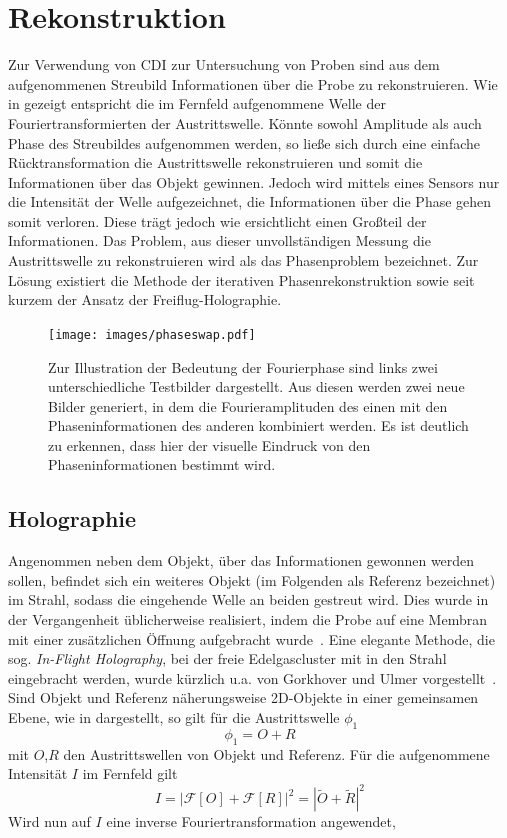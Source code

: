 \chapter{Rekonstruktion}
Zur Verwendung von CDI zur Untersuchung von Proben sind aus dem aufgenommenen Streubild Informationen über die Probe zu rekonstruieren. Wie in  gezeigt entspricht die im Fernfeld aufgenommene Welle der Fouriertransformierten der Austrittswelle. Könnte sowohl Amplitude als auch Phase des Streubildes aufgenommen werden, so ließe sich durch eine einfache Rücktransformation die Austrittswelle rekonstruieren und somit die Informationen über das Objekt gewinnen. Jedoch wird mittels eines Sensors nur die Intensität der Welle aufgezeichnet, die Informationen über die Phase gehen somit verloren. Diese trägt jedoch wie  ersichtlicht einen Großteil der Informationen. Das Problem, aus dieser unvollständigen Messung die Austrittswelle zu rekonstruieren wird als das Phasenproblem bezeichnet. Zur Lösung existiert die Methode der iterativen Phasenrekonstruktion sowie seit kurzem der Ansatz der Freiflug-Holographie.

\begin{figure}
	\centering
	\texttt{[image: images/phaseswap.pdf]}
	\caption[Bedeutung der Fourierphase]{Zur Illustration der Bedeutung der Fourierphase sind links zwei unterschiedliche Testbilder dargestellt. Aus diesen werden zwei neue Bilder generiert, in dem die Fourieramplituden des einen mit den Phaseninformationen des anderen kombiniert werden. Es ist deutlich zu erkennen, dass hier der visuelle Eindruck von den Phaseninformationen bestimmt wird.}
	\label{fig:phaseswap}
\end{figure}
\section{Holographie}
Angenommen neben dem Objekt, über das Informationen gewonnen werden sollen, befindet sich ein weiteres Objekt (im Folgenden als Referenz bezeichnet) im Strahl, sodass die eingehende Welle an beiden gestreut wird. Dies wurde in der Vergangenheit üblicherweise realisiert, indem die Probe auf eine Membran mit einer zusätzlichen Öffnung aufgebracht wurde~\cite{eisebitt2004}. Eine elegante Methode, die sog. \textit{In-Flight Holography}, bei der freie Edelgascluster mit in den Strahl eingebracht werden, wurde kürzlich u.a. von Gorkhover und Ulmer vorgestellt~\cite{gorkhover2016,ulmer2015}. 
Sind Objekt und Referenz näherungsweise 2D-Objekte in einer gemeinsamen Ebene, wie in  dargestellt, so gilt für die Austrittswelle $\phi_1$
\begin{equation}
	\phi_1=O+R
\end{equation}
mit $O$,$R$ den Austrittswellen von Objekt und Referenz. Für die aufgenommene Intensität $I$ im Fernfeld gilt
\begin{equation}
	I=\left|\mathscr{F}\left[O\right]+\mathscr{F}\left[R\right]\right|^2=\left|\tilde{O}+\tilde{R}\right|^2
\end{equation}
Wird nun auf $I$ eine inverse Fouriertransformation angewendet,

